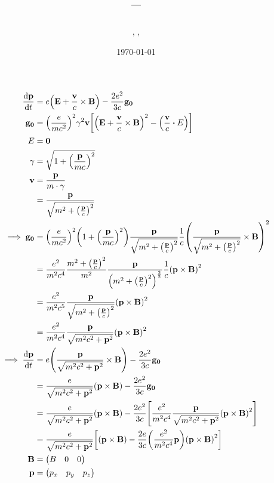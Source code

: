\documentclass{report}
\title{
    \Title\\
    \large \Course\ --\ \Session}
\author{\Name, \href{mailto:\Email}\Email, \SID}
\date{\normalsize\today
}
\begin{document}
    \maketitle
    \begin{align*}
        \dv{\vb{p}}{t} &= e \pqty{\vb{E} + \frac{\vb{v}}{c} \times \vb{B}} - \frac{2 e^2}{3 c} \vb{g_0}\\
        \vb{g_0} &= \pqty{\frac{e}{mc^2}}^2 \gamma^2 \vb{v} \bqty{\pqty{\vb{E} + \frac{\vb{v}}{c} \times \vb{B}}^2 - \pqty{\frac{\vb{v}}{c} \vdot E}}\\
        E &= \vb{0}\\
        \gamma &= \sqrt{1 + \pqty{\frac{\vb{p}}{m c}}^2}\\
        \vb{v} &= \frac{\vb{p}}{m \cdot \gamma}\\
        &= \frac{\vb{p}}{\sqrt{m^2 + \pqty{\frac{\vb{p}}{c}}^2}}\\
        \implies \vb{g_0} &= \pqty{\frac{e}{mc^2}}^2 \pqty{1 + \pqty{\frac{\vb{p}}{m c}}^2} \frac{\vb{p}}{\sqrt{m^2 + \pqty{\frac{\vb{p}}{c}}^2}} \frac{1}{c} \pqty{\frac{\vb{p}}{\sqrt{m^2 + \pqty{\frac{\vb{p}}{c}}^2}} \times \vb{B}}^2\\
        &= \frac{e^2}{m^2 c^4} \frac{m^2 + \pqty{\frac{\vb{p}}{c}}^2}{m^2} \frac{\vb{p}}{\pqty{m^2 + \pqty{\frac{\vb{p}}{c}}^2}^{\frac{3}{2}}} \frac{1}{c} \pqty{\vb{p} \times \vb{B}}^2\\
        &= \frac{e^2}{m^2 c^5} \frac{\vb{p}}{\sqrt{m^2 + \pqty{\frac{\vb{p}}{c}}^2}} \pqty{\vb{p} \times \vb{B}}^2\\
        &= \frac{e^2}{m^2 c^4} \frac{\vb{p}}{\sqrt{m^2 c^2 + \vb{p}^2}} \pqty{\vb{p} \times \vb{B}}^2\\
        \implies \dv{\vb{p}}{t} &= e \pqty{\frac{\vb{p}}{\sqrt{m^2 c^2 + \vb{p}^2}} \times \vb{B}} - \frac{2 e^2}{3 c} \vb{g_0}\\
        &= \frac{e}{\sqrt{m^2 c^2 + \vb{p}^2}} \pqty{\vb{p} \times \vb{B}} - \frac{2 e^2}{3 c} \vb{g_0}\\
        &= \frac{e}{\sqrt{m^2 c^2 + \vb{p}^2}} \pqty{\vb{p} \times \vb{B}} - \frac{2 e^2}{3 c} \bqty{\frac{e^2}{m^2 c^4} \frac{\vb{p}}{\sqrt{m^2 c^2 + \vb{p}^2}} \pqty{\vb{p} \times \vb{B}}^2}\\
        &= \frac{e}{\sqrt{m^2 c^2 + \vb{p}^2}}  \bqty{\pqty{\vb{p} \times \vb{B}} - \frac{2 e}{3 c} \pqty{\frac{e^2}{m^2 c^4} \vb{p}} \pqty{\vb{p} \times \vb{B}}^2}\\
        \vb{B} &= \pmqty{B & 0 & 0}\\
        \vb{p} &= \pmqty{p_x & p_y & p_z}\\

\end{align*}
\end{document}

